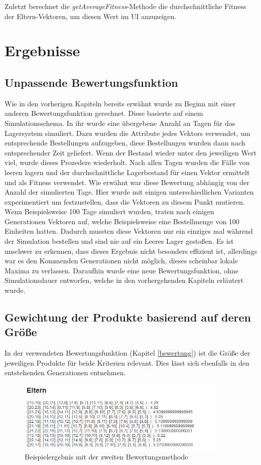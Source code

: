 \documentclass[]{scrartcl}
\begin{document}
Zuletzt berechnet die \textit{getAverageFitness}-Methode die durchschnittliche Fitness der Eltern-Vektoren, um diesen Wert im UI anzuzeigen.

\newpage
\section{Ergebnisse}
\label{ergebnisse}

\subsection{Unpassende Bewertungsfunktion}
Wie in den vorherigen Kapiteln bereits erwähnt wurde zu Beginn mit einer anderen Bewertungsfunktion gerechnet. Diese basierte auf einem Simulationsschema. In ihr wurde eine übergebene Anzahl an Tagen für das Lagersystem simuliert. Dazu wurden die Attribute jedes Vektors verwendet, um entsprechende Bestellungen aufzugeben, diese Bestellungen wurden dann nach entsprechender Zeit geliefert. Wenn der Bestand wieder unter den jeweiligen Wert viel, wurde dieses Prozedere wiederholt. Nach allen Tagen wurden die Fälle von leeren lagern und der durchschnittliche Lagerbestand für einen Vektor ermittelt und als Fitness verwendet. Wie erwähnt war diese Bewertung abhängig von der Anzahl der simulierten Tage. Hier wurde mit einigen unterschiedlichen Varianten experimentiert um festzustellen, dass die Vektoren zu diesem Punkt mutieren. Wenn Beispielsweise 100 Tage simuliert wurden, traten nach einigen Generationen Vektoren auf, welche Beispielsweise eine Bestellmenge von 100 Einheiten hatten. Dadurch mussten diese Vektoren nur ein einziges mal während der Simulation bestellen und sind nie auf ein Leeres Lager gestoßen. Es ist unschwer zu erkennen, dass dieses Ergebnis nicht besonders effizient ist, allerdings war es den Kommenden Generationen nicht möglich, dieses scheinbar lokale Maxima zu verlassen. Daraufhin wurde eine neue Bewertungsfunktion, ohne Simulationsdauer entworfen, welche in den vorhergehenden Kapiteln erläutert wurde.


\subsection{Gewichtung der Produkte basierend auf deren Größe}
In der verwendeten Bewertungsfunktion (Kapitel \ref{bewertung}) ist die Größe der jeweiligen Produkte für beide Kriterien relevant. Dies lässt sich ebenfalls in den entstehenden Generationen entnehmen.

\begin{figure}[htbp]
	\centering
	\includegraphics[width=0.9\textwidth]{res/gewicht_vektoren.png}
	\caption{Beispielergebnis mit der zweiten Bewertungsmethode}
	\label{img:vektoren_gewicht}
\end{figure}
\end{document}
